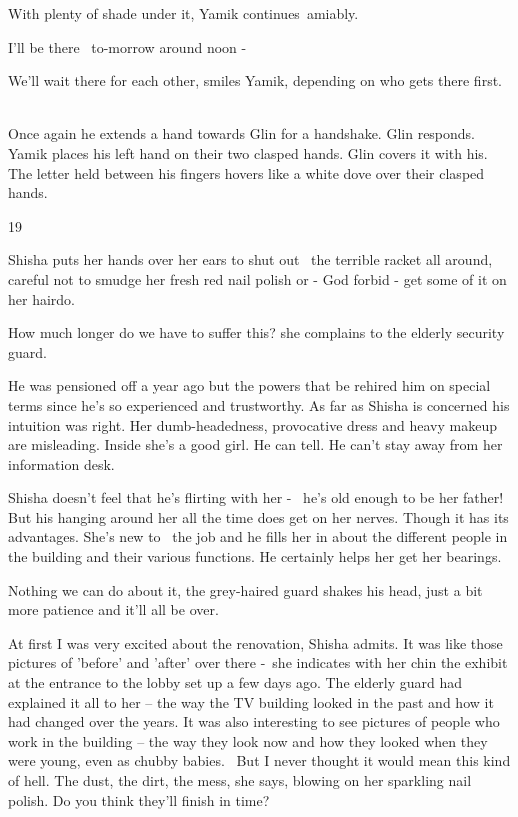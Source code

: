 \documentclass[12pt]{book}
\begin{document}
{\textquotedbl}With plenty of shade under it,{\textquotedbl} Yamik continues~amiably.

{\textquotedbl}I'll be there \ to-morrow around noon -{\textquotedbl}

{\textquotedbl}We'll wait there for each other,{\textquotedbl} smiles Yamik, {\textquotedbl}depending on who gets there
first.{\textquotedbl} ~

Once again he extends a hand towards Glin for a handshake. Glin responds. Yamik places his left hand on their two
clasped hands. Glin covers it with his. The letter held between his fingers hovers like a white dove over their clasped
hands.


\bigskip

19

Shisha puts her hands over her ears to shut out \ the terrible racket all around, careful not to smudge her fresh red
nail polish or - God forbid - get some of it on her hairdo.

{\textquotedbl}How much longer do we have to suffer this?{\textquotedbl} she complains to the elderly security guard.

He was pensioned off a year ago but the powers that be rehired him on special terms since he's so experienced and
trustworthy. As far as Shisha is concerned his intuition was right. Her dumb-headedness, provocative dress and heavy
makeup are misleading. Inside she's a good girl. He can tell. He can't stay away from her information desk.

Shisha doesn't feel that he's flirting with her - \ he's old enough to be her father! But his hanging around her all the
time does get on her nerves. Though it has its advantages. She's new to{ }\ the job and he fills her in
about the different people in the building and their various functions. He certainly helps her get her bearings.

{\textquotedbl}Nothing we can do about it,{\textquotedbl} the grey-haired guard shakes his head, {\textquotedbl}just a
bit more patience and it'll all be over.{\textquotedbl} ~

{\textquotedbl}At first I was very excited about the renovation,{\textquotedbl} Shisha admits. {\textquotedbl}It was
like those pictures of 'before' and 'after' over there -{\textquotedbl}~she indicates with her chin the exhibit at the
entrance to the lobby set up a few days ago. The elderly guard had explained it all to her -- the way the TV building
looked in the past and how it had changed over the years. It was also interesting to see pictures of people who work in
the building -- the way they look now and how they looked when they were young, even as chubby babies.
~{\textquotedbl}But I never thought it would mean this kind of hell. The dust, the dirt, the mess,{\textquotedbl} she
says, blowing on her sparkling nail polish. {\textquotedbl}Do you think they'll finish in time?{\textquotedbl}
\end{document}
